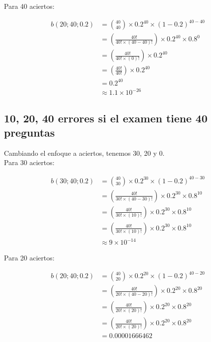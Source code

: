 \documentclass[letterpaper,12pt]{memoir}
\theoremstyle{definition}
\begin{document}
Para 40 aciertos:

\begin{equation*}
  \begin{split}
  b(20;40;0.2)&={40\choose 40} \times 0.2^{40} \times (1 - 0.2)^{40-40}\\
  &=(\frac{40!}{40!\times(40-40)!}) \times 0.2^{40} \times 0.8^{0}\\
  &=(\frac{40!}{40!\times(0)!}) \times 0.2^{40} \\
  &=(\frac{40!}{40!}) \times 0.2^{40} \\
  &= 0.2^{40} \\
  &\approx 1.1 \times 10^{-26}
  \end{split} 
\end{equation*}

\subsection*{10, 20, 40 errores si el examen tiene 40 preguntas}

Cambiando el enfoque a aciertos, tenemos 30, 20 y 0.\\

Para 30 aciertos:

\begin{equation*}
  \begin{split}
  b(30;40;0.2)&={40\choose 30} \times 0.2^{30} \times (1 - 0.2)^{40-30}\\
  &=(\frac{40!}{30!\times(40-30)!}) \times 0.2^{30} \times 0.8^{10}\\
  &=(\frac{40!}{30!\times(10)!}) \times 0.2^{30} \times 0.8^{10}\\
  &=(\frac{40!}{30!\times(10)!}) \times 0.2^{30} \times 0.8^{10}\\
  &\approx 9 \times 10^{-14}
  \end{split} 
\end{equation*}

Para 20 aciertos:

\begin{equation*}
  \begin{split}
  b(20;40;0.2)&={40\choose 20} \times 0.2^{20} \times (1 - 0.2)^{40-20}\\
  &=(\frac{40!}{20!\times(40-20)!}) \times 0.2^{20} \times 0.8^{20}\\
  &=(\frac{40!}{20!\times(20)!}) \times 0.2^{20} \times 0.8^{20}\\
  &=(\frac{40!}{20!\times(20)!}) \times 0.2^{20} \times 0.8^{20}\\
  &= 0.00001666462
  \end{split} 
\end{equation*}
\end{document}
